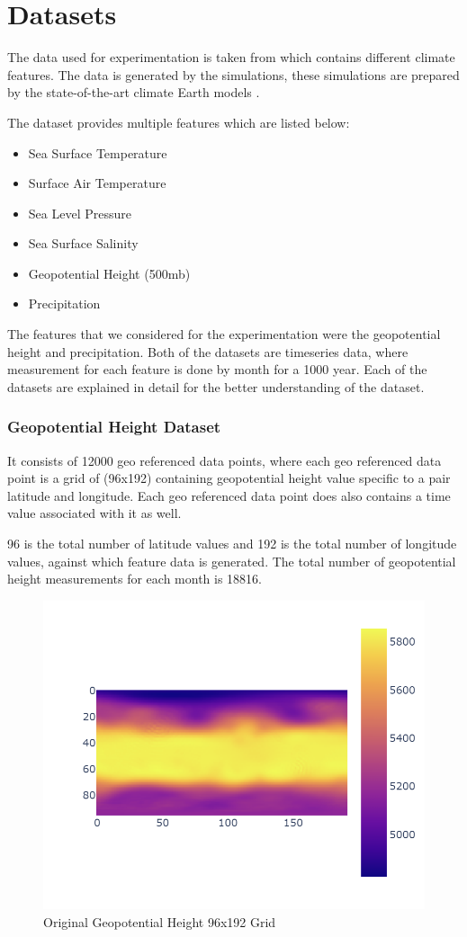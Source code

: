 
\clearpage
\cleardoublepage

\chapter{Datasets}
\label{chap:dataset}

The data used for experimentation is taken from \cite{willi_rath_2023_7779883} which contains different climate features. The data is generated by the simulations, these simulations are prepared by the state-of-the-art climate Earth models \cite{willi_rath_2023_7779883}.

The dataset provides multiple features which are listed below:
\begin{itemize}
    \item Sea Surface Temperature
    \item Surface Air Temperature
    \item Sea Level Pressure
    \item Sea Surface Salinity
    \item Geopotential Height (500mb)
    \item Precipitation
\end{itemize}

The features that we considered for the experimentation were the geopotential height and precipitation.
Both of the datasets are timeseries data, where measurement for each feature is done by month for a 1000 year. Each of the datasets are explained in detail for the better understanding of the dataset.
\subsection{Geopotential Height Dataset}
It consists of 12000 geo referenced data points, where each geo referenced data point is a grid of (96x192) containing geopotential height value specific to a pair latitude and longitude.
Each geo referenced data point does also contains a time value associated with it as well.

96  is the total number of latitude values and  192 is the total number of longitude values, against which feature data is generated. The total number of geopotential height measurements for each month is 18816.

\begin{figure}[H]
    \centering
    \includegraphics[width=0.6\linewidth]{figures/chapter-5/data_original.png}
    \caption{Original Geopotential Height 96x192 Grid }
    \label{fig:org_geopoth}
\end{figure}

